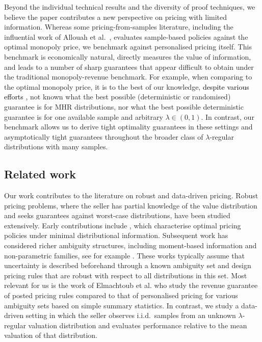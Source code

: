 \documentclass[11pt]{article}
\newcommand{\brown}[1]{\textcolor{black}{#1}}
\begin{document}
Beyond the individual technical results and the diversity of proof techniques, we believe the paper contributes a new perspective on pricing with limited information. Whereas some pricing-from-samples literature, including the influential work of Allouah et al.~\cite{allouah2022pricing}, evaluates sample-based policies against the optimal monopoly price, we benchmark against personalised pricing itself. This benchmark is economically natural, directly measures the value of information, and leads to a number of sharp guarantees that appear difficult to obtain under the traditional monopoly-revenue benchmark. {For example, when comparing to the optimal monopoly price, it is to the best of our knowledge, \brown{despite various efforts \cite{dhangwatnotai2010revenue,babaioff2018two,daskalakis2020more,allouah2022pricing},} not known what the best possible (deterministic or randomised) guarantee is for MHR distributions, nor what the best possible deterministic guarantee  is for one available sample and arbitrary $\lambda \in (0,1)$. In contrast, our benchmark allows us to derive tight optimality guarantees in these settings and asymptotically tight guarantees throughout the broader class of $\lambda$-regular distributions with many samples.}
\subsection{Related work}
\label{sec:related-work}

Our work contributes to the literature on robust and data-driven pricing. 
Robust pricing problems, where the seller has partial knowledge of the value distribution and seeks guarantees against worst-case distributions, have been studied extensively. 
Early contributions include \cite{bergemann2008pricing,eren2010monopoly}, which characterise optimal pricing policies under minimal distributional information. Subsequent work has considered richer ambiguity structures, including moment-based information and non-parametric families, see for example \cite{azarmicali2013, azar2013optimal, kos2015selling, carrasco2018optimal, elmachtoub2021value, chen2022distribution, giannakopoulos2023robust, allouah2023optimal, van2026distributionally}.
These works typically assume that uncertainty is described beforehand through a known ambiguity set and design pricing rules that are robust with respect to all distributions in this set. 
Most relevant for us is the work of Elmachtoub et al. \cite{elmachtoub2021value} who study the revenue guarantee of posted pricing rules compared to that of personalised pricing for various ambiguity sets based on simple summary statistics. In contrast, we study a data-driven setting in which the seller observes i.i.d.\ samples from an unknown $\lambda$-regular valuation distribution and evaluates performance relative to the mean valuation of that distribution.
\end{document}
